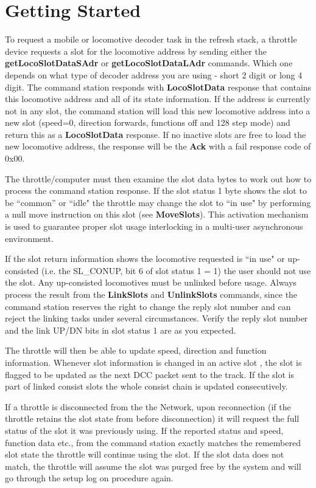 \section{Getting Started}

To request a mobile or locomotive decoder task in the refresh stack, a throttle device requests a slot for the locomotive address by sending either the \textbf{getLocoSlotDataSAdr} or \textbf{getLocoSlotDataLAdr} commands. Which one depends on what type of decoder address you are using - short 2 digit or long 4 digit. The command station responds with \textbf{LocoSlotData} response that contains this locomotive address and all of its state information. If the address is currently not in any slot, the command station will load this new locomotive address into a new slot (speed=0, direction forwards, functions off and 128 step mode) and return this as a \textbf{LocoSlotData} response. If no inactive slots are free to load the new locomotive address, the response will be the \textbf{Ack} with a fail response code of 0x00.

The throttle/computer must then examine the slot data bytes to work out how to process the command station response. If the slot status 1 byte shows the slot to be ``common'' or ``idle" the throttle may change the slot to ``in use" by performing a null move instruction on this slot (see \textbf{MoveSlots}). This activation mechanism is used to guarantee proper slot usage interlocking in a multi-user asynchronous environment.

If the slot return information shows the locomotive requested is ``in use" or up-consisted (i.e. the SL\_CONUP, bit 6 of slot status 1 = 1) the user should not use the slot. Any up-consisted locomotives must be unlinked before usage. Always process the result from the \textbf{LinkSlots} and \textbf{UnlinkSlots} commands, since the command station reserves the right to change the reply slot number and can reject the linking tasks under several circumstances. Verify the reply slot number and the link UP/DN bits in slot status 1 are as you expected.

The throttle will then be able to update speed, direction and function information. Whenever slot information is changed in an active slot , the slot is flagged to be updated as the next DCC packet sent to the track. If the slot is part of linked consist slots the whole consist chain is updated consecutively.

If a throttle is disconnected from the the Network, upon reconnection (if the throttle retains the slot state from before disconnection) it will request the full status of the slot it was previously using. If the reported status and speed, function data etc., from the command station exactly matches the remembered slot state the throttle will continue using the slot. If the slot data does not match, the throttle will assume the slot was purged free by the system and will go through the setup log on procedure again.

